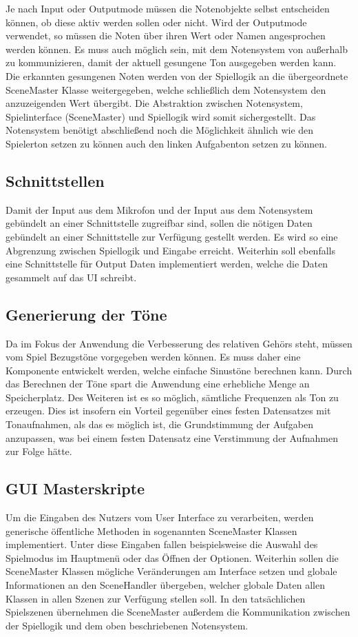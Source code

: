 Je nach Input oder Outputmode müssen die Notenobjekte selbst entscheiden können, ob diese aktiv werden sollen oder nicht. Wird der Outputmode verwendet, so müssen die Noten über ihren Wert oder Namen angesprochen werden können. Es muss auch möglich sein, mit dem Notensystem von außerhalb zu kommunizieren, damit der aktuell gesungene Ton ausgegeben werden kann. Die erkannten gesungenen Noten werden von der Spiellogik an die übergeordnete SceneMaster Klasse weitergegeben, welche schließlich dem Notensystem den anzuzeigenden Wert übergibt. Die Abstraktion zwischen Notensystem, Spielinterface (SceneMaster) und Spiellogik wird somit sichergestellt. Das Notensystem benötigt abschließend noch die Möglichkeit ähnlich wie den Spielerton setzen zu können auch den linken Aufgabenton setzen zu können.\\

\subsection{Schnittstellen}
Damit der Input aus dem Mikrofon und der Input aus dem Notensystem gebündelt an einer Schnittstelle zugreifbar sind, sollen die nötigen Daten gebündelt an einer Schnittstelle zur Verfügung gestellt werden. Es wird so eine Abgrenzung zwischen Spiellogik und Eingabe erreicht. Weiterhin soll ebenfalls eine Schnittstelle für Output Daten implementiert werden, welche die Daten gesammelt auf das UI schreibt.

\subsection{Generierung der Töne}
Da im Fokus der Anwendung die Verbesserung des relativen Gehörs steht, müssen vom Spiel Bezugstöne vorgegeben werden können. Es muss daher eine Komponente entwickelt werden, welche einfache Sinustöne berechnen kann. Durch das Berechnen der Töne spart die Anwendung eine erhebliche Menge an Speicherplatz. Des Weiteren ist es so möglich, sämtliche Frequenzen als Ton zu erzeugen. Dies ist insofern ein Vorteil gegenüber eines festen Datensatzes mit Tonaufnahmen, als das es möglich ist, die Grundstimmung der Aufgaben anzupassen, was bei einem festen Datensatz eine Verstimmung der Aufnahmen zur Folge hätte. 

\subsection{GUI Masterskripte}
Um die Eingaben des Nutzers vom User Interface zu verarbeiten, werden generische öffentliche Methoden in sogenannten SceneMaster Klassen implementiert. Unter diese Eingaben fallen beispielsweise die Auswahl des Spielmodus im Hauptmenü oder das Öffnen der Optionen. Weiterhin sollen die SceneMaster Klassen mögliche Veränderungen am Interface setzen und globale Informationen an den SceneHandler übergeben, welcher globale Daten allen Klassen in allen Szenen zur Verfügung stellen soll. In den tatsächlichen Spielszenen übernehmen die SceneMaster außerdem die Kommunikation zwischen der Spiellogik und dem oben beschriebenen Notensystem.

